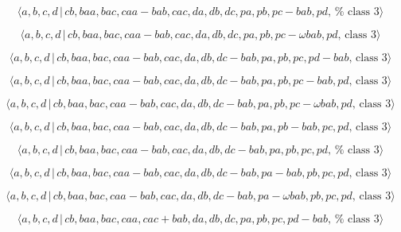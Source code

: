 \documentclass[10pt]{article}
\begin{document}
\begin{equation}
\langle a,b,c,d\,|\,cb,baa,bac,caa-bab,cac,da,db,dc,pa,pb,pc-bab,pd,\,\text{%
class }3\rangle  \tag{7.3767}
\end{equation}

\begin{equation}
\langle a,b,c,d\,|\,cb,baa,bac,caa-bab,cac,da,db,dc,pa,pb,pc-\omega bab,pd,\,%
\text{class }3\rangle  \tag{7.3768}
\end{equation}

\begin{equation}
\langle a,b,c,d\,|\,cb,baa,bac,caa-bab,cac,da,db,dc-bab,pa,pb,pc,pd-bab,\,%
\text{class }3\rangle  \tag{7.3769}
\end{equation}

\begin{equation}
\langle a,b,c,d\,|\,cb,baa,bac,caa-bab,cac,da,db,dc-bab,pa,pb,pc-bab,pd,\,%
\text{class }3\rangle  \tag{7.3770}
\end{equation}

\begin{equation}
\langle a,b,c,d\,|\,cb,baa,bac,caa-bab,cac,da,db,dc-bab,pa,pb,pc-\omega
bab,pd,\,\text{class }3\rangle  \tag{7.3771}
\end{equation}

\begin{equation}
\langle a,b,c,d\,|\,cb,baa,bac,caa-bab,cac,da,db,dc-bab,pa,pb-bab,pc,pd,\,%
\text{class }3\rangle  \tag{7.3772}
\end{equation}

\begin{equation}
\langle a,b,c,d\,|\,cb,baa,bac,caa-bab,cac,da,db,dc-bab,pa,pb,pc,pd,\,\text{%
class }3\rangle  \tag{7.3773}
\end{equation}

\begin{equation}
\langle a,b,c,d\,|\,cb,baa,bac,caa-bab,cac,da,db,dc-bab,pa-bab,pb,pc,pd,\,%
\text{class }3\rangle  \tag{7.3774}
\end{equation}

\begin{equation}
\langle a,b,c,d\,|\,cb,baa,bac,caa-bab,cac,da,db,dc-bab,pa-\omega
bab,pb,pc,pd,\,\text{class }3\rangle  \tag{7.3775}
\end{equation}

\begin{equation}
\langle a,b,c,d\,|\,cb,baa,bac,caa,cac+bab,da,db,dc,pa,pb,pc,pd-bab,\,\text{%
class }3\rangle  \tag{7.3776}
\end{equation}
\end{document}
